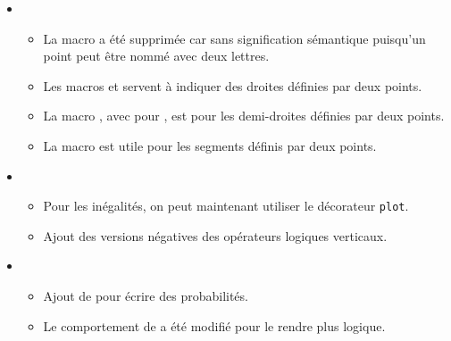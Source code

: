\documentclass[12pt,a4paper]{book}
\begin{document}
\begin{description}
\begin{itemize}[itemsep=.5em]
\begin{itemize}[itemsep=.5em]
        Pour utiliser des parenthèses non extensibles, on passera par  et  où  est pour .

		\item Ajout de  pour rendre public l'opérateur intégral proposé par défaut par \LaTeX.
    \end{itemize}




    \item {}
    \begin{itemize}[itemsep=.5em]
        \item La macro  a été supprimée car sans signification sémantique puisqu'un point peut être nommé avec deux lettres.

        \item Les macros  et  servent à indiquer des droites définies par deux points.

        \item La macro , avec  pour , est pour les demi-droites définies par deux points.

        \item La macro  est utile pour les segments définis par deux points.
    \end{itemize}




    \item {}
    \begin{itemize}[itemsep=.5em]
        \item Pour les inégalités, on peut maintenant utiliser le décorateur \verb+plot+.

		\item Ajout des versions négatives des opérateurs logiques verticaux.
    \end{itemize}




    \item {}
    \begin{itemize}[itemsep=.5em]
        \item Ajout de  pour écrire des probabilités.

		\item Le comportement de  a été modifié pour le rendre plus logique.
    \end{itemize}
\end{itemize}

\end{description}
\end{document}
